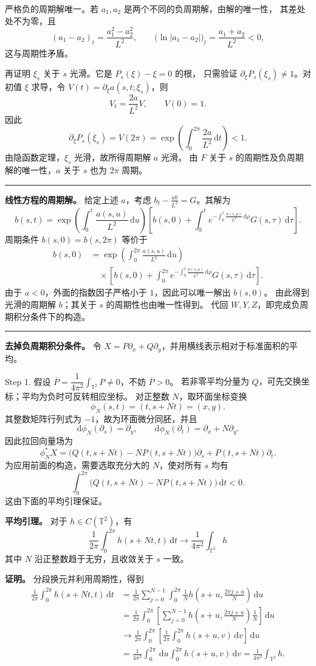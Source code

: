 \documentclass[11pt,a4paper]{ctexart}
\newcommand{\T}{\mathbb T}
\newcommand{\dd}{\,\mathrm d}
\newcommand{\sep}{\par\vspace{5pt}\noindent\rule{\linewidth}{0.7pt}\par\vspace{5pt}}
\newcommand{\red}[1]{{\color{red}#1}}
\begin{document}
严格负的周期解唯一。若 $a_1,a_2$ 是两个不同的负周期解，由解的唯一性，
其差处处不为零，且
\[(a_1-a_2)_t=\frac{a_1^2-a_2^2}{L^2},\qquad
\bigl(\ln|a_1-a_2|\bigr)_t=\frac{a_1+a_2}{L^2}<0,\]
这与周期性矛盾。

再证明 $\xi_s$ 关于 $s$ 光滑。它是 $P_s(\xi)-\xi=0$ 的根，
只需验证 $\partial_\xi P_s(\xi_s)\ne1$。对初值 $\xi$ 求导，令
$V(t)=\partial_\xi a(s,t;\xi_s)$，则
\[V_t=\frac{2a}{L^2}V,\qquad V(0)=1.\]
因此
\[\partial_\xi P_s(\xi_s)=V(2\pi)
=\exp\!\left(\int_0^{2\pi}\frac{2a}{L^2}\dd t\right)<1.\]
由隐函数定理，$\xi_s$ 光滑，故所得周期解 $a$ 光滑。
由 $F$ 关于 $s$ 的周期性及负周期解的唯一性，$a$ 关于 $s$ 也为 $2\pi$ 周期。
\sep
\textbf{线性方程的周期解。} 给定上述 $a$，考虑 $b_t-\frac{ab}{L^2}=G$。其解为
\[b(s,t)=\exp\!\left(\int_0^t\frac{a(s,u)}{L^2}\dd u\right)
\left[b(s,0)+\int_0^t
e^{-\int_0^\tau\frac{a(s,\rho)}{L^2}\dd\rho}G(s,\tau)\dd\tau\right].\]
周期条件 $b(s,0)=b(s,2\pi)$ 等价于
\begin{align*}
b(s,0)
&=\exp\!\left(\int_0^{2\pi}\frac{a(s,u)}{L^2}\dd u\right)\\[-2pt]
&\quad\times\left[b(s,0)+\int_0^{2\pi}
e^{-\int_0^\tau\frac{a(s,\rho)}{L^2}\dd\rho}G(s,\tau)\dd\tau\right].
\end{align*}
由于 $a<0$，外面的指数因子严格小于 $1$，因此可以唯一解出 $b(s,0)$。
由此得到光滑的周期解 $b$；其关于 $s$ 的周期性也由唯一性得到。
代回 $W,Y,Z$，即完成负周期积分条件下的构造。
\sep
\textbf{去掉负周期积分条件。}
令 $X=P\partial_x+Q\partial_y$，并用横线表示相对于标准面积的平均。

\red{Step 1. 假设 $\overline P=\dfrac1{4\pi^2}\int_{\T^2}P\ne0$，不妨 $\overline P>0$。}
若非零平均分量为 $Q$，可先交换坐标；平均为负时可反转相应坐标。
对正整数 $N$，取环面坐标变换
\[\phi_N(s,t)=(t,s+Nt)=(x,y).\]
其整数矩阵行列式为 $-1$，故为环面微分同胚，并且
\[\mathrm d\phi_N(\partial_s)=\partial_y,\qquad
\mathrm d\phi_N(\partial_t)=\partial_x+N\partial_y.\]
因此拉回向量场为
\[\phi_N^*X=
\bigl(Q(t,s+Nt)-NP(t,s+Nt)\bigr)\partial_s
+P(t,s+Nt)\partial_t.\]
为应用前面的构造，需要选取充分大的 $N$，使对所有 $s$ 均有
\[\int_0^{2\pi}\bigl(Q(t,s+Nt)-NP(t,s+Nt)\bigr)\dd t<0.\]
这由下面的平均引理保证。

\textbf{平均引理。} 对于 $h\in C(\T^2)$，有
\[\frac1{2\pi}\int_0^{2\pi}h(s+Nt,t)\dd t
\longrightarrow\frac1{4\pi^2}\int_{\T^2}h\]
其中 $N$ 沿正整数趋于无穷，且收敛关于 $s$ 一致。

\textbf{证明。} 分段换元并利用周期性，得到
\begin{align*}
\frac1{2\pi}\int_0^{2\pi}h(s+Nt,t)\dd t
&=\frac1{2\pi}\sum_{j=0}^{N-1}\int_0^{2\pi}
\frac1N h\!\left(s+u,\frac{2\pi j+u}{N}\right)\dd u\\
&=\frac1{2\pi}\int_0^{2\pi}\left[\sum_{j=0}^{N-1}
h\!\left(s+u,\frac{2\pi j+u}{N}\right)\frac1N\right]\dd u\\
&\longrightarrow\frac1{2\pi}\int_0^{2\pi}
\left[\frac1{2\pi}\int_0^{2\pi}h(s+u,v)\dd v\right]\dd u\\
&=\frac1{4\pi^2}\int_0^{2\pi}\dd u\int_0^{2\pi}h(s+u,v)\dd v
=\frac1{4\pi^2}\int_{\T^2}h.
\end{align*}
\end{document}
